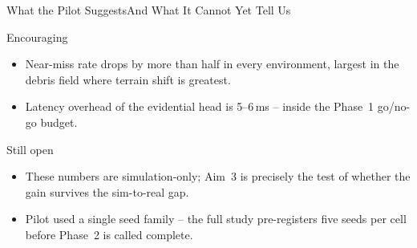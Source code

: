\begin{frame}{What the Pilot Suggests}{And What It Cannot Yet Tell Us}
  \begin{minipage}[t]{0.48\textwidth}
    \begin{copperbox}{Encouraging}
      \footnotesize
      \begin{itemize}
        \item Near-miss rate drops by more than half in every environment,
          largest in the debris field where terrain shift is greatest.
        \item Latency overhead of the evidential head is 5--6\,ms --
          inside the Phase~1 go/no-go budget.
      \end{itemize}
    \end{copperbox}
  \end{minipage}\hfill
  \begin{minipage}[t]{0.48\textwidth}
    \begin{notebox}{Still open}
      \footnotesize
      \begin{itemize}
        \item These numbers are simulation-only; Aim~3 is precisely the
          test of whether the gain survives the sim-to-real gap.
        \item Pilot used a single seed family -- the full study pre-registers
          five seeds per cell before Phase~2 is called complete.
      \end{itemize}
    \end{notebox}
  \end{minipage}
\end{frame}
